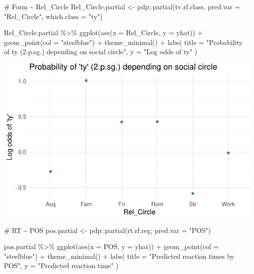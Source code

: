 \documentclass[
  11pt,
  letterpaper,
  DIV=11,
  numbers=noendperiod]{scrreprt}
\newenvironment{Shaded}{\begin{snugshade}}{\end{snugshade}}
\newcommand{\AttributeTok}[1]{\textcolor[rgb]{0.40,0.45,0.13}{#1}}
\newcommand{\CommentTok}[1]{\textcolor[rgb]{0.37,0.37,0.37}{#1}}
\newcommand{\FunctionTok}[1]{\textcolor[rgb]{0.28,0.35,0.67}{#1}}
\newcommand{\NormalTok}[1]{\textcolor[rgb]{0.00,0.23,0.31}{#1}}
\newcommand{\OtherTok}[1]{\textcolor[rgb]{0.00,0.23,0.31}{#1}}
\newcommand{\SpecialCharTok}[1]{\textcolor[rgb]{0.37,0.37,0.37}{#1}}
\newcommand{\StringTok}[1]{\textcolor[rgb]{0.13,0.47,0.30}{#1}}
\begin{document}
\begin{Shaded}
\begin{Highlighting}[]
\CommentTok{\# Form \textasciitilde{} Rel\_Circle}
\NormalTok{Rel\_Circle.partial }\OtherTok{\textless{}{-}}\NormalTok{ pdp}\SpecialCharTok{::}\FunctionTok{partial}\NormalTok{(tv.rf.class, }\AttributeTok{pred.var =} \StringTok{"Rel\_Circle"}\NormalTok{, }\AttributeTok{which.class =} \StringTok{"ty"}\NormalTok{)}

\NormalTok{Rel\_Circle.partial }\SpecialCharTok{\%\textgreater{}\%} 
  \FunctionTok{ggplot}\NormalTok{(}\FunctionTok{aes}\NormalTok{(}\AttributeTok{x =}\NormalTok{ Rel\_Circle, }\AttributeTok{y =}\NormalTok{ yhat)) }\SpecialCharTok{+}
  \FunctionTok{geom\_point}\NormalTok{(}\AttributeTok{col =} \StringTok{"steelblue"}\NormalTok{) }\SpecialCharTok{+}
  \FunctionTok{theme\_minimal}\NormalTok{() }\SpecialCharTok{+}
  \FunctionTok{labs}\NormalTok{(}
    \AttributeTok{title =} \StringTok{"Probability of \textquotesingle{}ty\textquotesingle{} (2.p.sg.) depending on social circle"}\NormalTok{,}
    \AttributeTok{y =} \StringTok{"Log odds of \textquotesingle{}ty\textquotesingle{}"}
\NormalTok{  )}
\end{Highlighting}
\end{Shaded}

\includegraphics{Decision_trees_and_random_forests_files/figure-pdf/unnamed-chunk-11-1.pdf}

\begin{Shaded}
\begin{Highlighting}[]
\CommentTok{\# RT \textasciitilde{} POS}
\NormalTok{pos.partial }\OtherTok{\textless{}{-}}\NormalTok{ pdp}\SpecialCharTok{::}\FunctionTok{partial}\NormalTok{(rt.rf.reg, }\AttributeTok{pred.var =} \StringTok{"POS"}\NormalTok{)}

\NormalTok{pos.partial }\SpecialCharTok{\%\textgreater{}\%} 
  \FunctionTok{ggplot}\NormalTok{(}\FunctionTok{aes}\NormalTok{(}\AttributeTok{x =}\NormalTok{ POS, }\AttributeTok{y =}\NormalTok{ yhat)) }\SpecialCharTok{+}
  \FunctionTok{geom\_point}\NormalTok{(}\AttributeTok{col =} \StringTok{"steelblue"}\NormalTok{) }\SpecialCharTok{+}
  \FunctionTok{theme\_minimal}\NormalTok{() }\SpecialCharTok{+}
  \FunctionTok{labs}\NormalTok{(}
    \AttributeTok{title =} \StringTok{"Predicted reaction times by POS"}\NormalTok{,}
    \AttributeTok{y =} \StringTok{"Predicted reaction time"}
\NormalTok{  )}
\end{Highlighting}
\end{Shaded}
\end{document}
